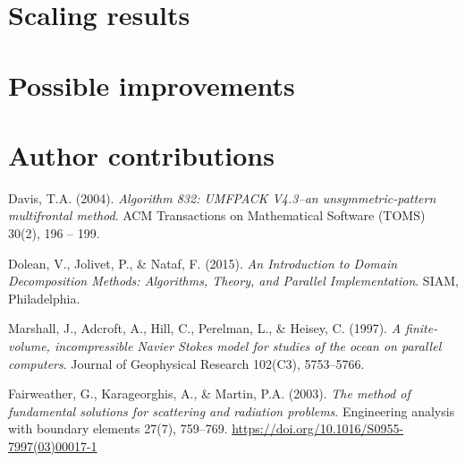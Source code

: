 \documentclass{article}
\begin{document}
	
	\section{Scaling results}
	
	\section{Possible improvements}
	
	\section{Author contributions}
	
	\begin{thebibliography}{9}
		Davis, T.A.
		(2004).
		\emph{Algorithm 832: UMFPACK V4.3--an unsymmetric-pattern multifrontal method}.
		ACM Transactions on Mathematical Software (TOMS)
		30(2), 196 -- 199.
		
		Dolean, V., Jolivet, P., \& Nataf, F.
		(2015).
		\emph{An Introduction to Domain Decomposition Methods: Algorithms, Theory, and Parallel Implementation}.
		SIAM, Philadelphia.
		
		Marshall, J., Adcroft, A., Hill, C., Perelman, L., \& Heisey, C.
		(1997).
		\emph{A finite-volume, incompressible Navier Stokes model for studies of the ocean on parallel computers}.
		Journal of Geophysical Research 
		102(C3), 5753--5766.
		
		Fairweather, G., Karageorghis, A., \& Martin, P.A.
		(2003).
		\emph{The method of fundamental solutions for scattering and radiation problems}.
		Engineering analysis with boundary elements   
		27(7), 759--769.
		\url{https://doi.org/10.1016/S0955-7997(03)00017-1}
		
	\end{thebibliography}
\end{document}
